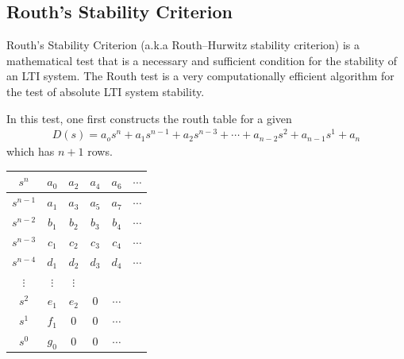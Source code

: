 \documentclass[twoside]{article}
\begin{document}
\subsection{Routh's Stability Criterion} 

Routh's Stability Criterion (a.k.a  Routh–Hurwitz stability criterion)
is a mathematical test that is a necessary and sufficient condition 
for the stability of an LTI system. The Routh test is a very 
computationally efficient algorithm for the test of absolute
LTI system stability. 

In this test, one first constructs the routh table for a given
%
\begin{align*}
D(s) = a_o s^n + a_1 s^{n-1} + a_2 s^{n-3} + \cdots + a_{n-2} s^{2}
+ a_{n-1} s^{1} + a_n 
\end{align*}  
%
which has $n+1$ rows. 
%
\begin{table}[h]
\begin{center}
\begin{tabular}{|c || c || c c c c |}
\hline
$s^n$ & $a_0$ & $a_2$ & $a_4$ & $a_6$ & $\cdots$ 
\\ \hline
$s^{n-1}$ & $a_1$ & $a_3$ & $a_5$ & $a_7$ & $\cdots$ 
\\ \hline
$s^{n-2}$ & $b_1$ & $b_2$ & $b_3$ & $b_4$ & $\cdots$ 
\\ \hline
$s^{n-3}$ & $c_1$ & $c_2$ & $c_3$ & $c_4$ & $\cdots$ 
\\ \hline
$s^{n-4}$ & $d_1$ & $d_2$ & $d_3$ & $d_4$ & $\cdots$ 
\\ \hline
$\vdots$ & $\vdots$ & $\vdots$ &  & & 
\\ \hline
$s^{2}$ & $e_1$ & $e_2$ & $0$ & $\cdots$  & 
\\ \hline
$s^{1}$ & $f_1$ & $0$ & $0$ & $\cdots$  & 
\\ \hline
$s^{0}$ & $g_0$ & $0$ & $0$ & $\cdots$  & 
\\ \hline
\end{tabular}
\end{center}
\end{table}
\end{document}
